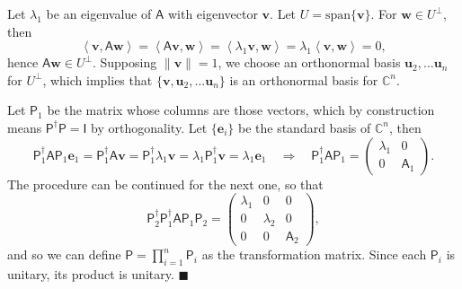 \documentclass[letter-paper]{tufte-book}
\newenvironment{proof}[1][Proof]{\begin{trivlist}
\item[\hskip \labelsep {\bfseries #1}]}{\end{trivlist}}
\newcommand{\inner}[2]{\left\langle #1, #2\right\rangle}
\newcommand{\As}{{\mathsf{A}}}
\newcommand{\Is}{{\mathsf{I}}}
\newcommand{\Ps}{{\mathsf{P}}}
\newcommand{\eb}{{\boldsymbol{e}}}
\newcommand{\ub}{{\boldsymbol{u}}}
\newcommand{\vb}{{\boldsymbol{v}}}
\newcommand{\wb}{{\boldsymbol{w}}}
\newcommand{\qed}{\hfill$\blacksquare$}
\begin{document}
\begin{proof}
  Let $\lambda_1$ be an eigenvalue of $\As$ with eigenvector $\vb$. Let $U = \mbox{span}\{\vb\}$. For $\wb \in U^\perp$, then
  \begin{equation*}
    \inner{\vb}{\As \wb} = \inner{\As \vb}{\wb} = \inner{\lambda_1\vb}{\wb} = \lambda_1\inner{\vb}{\wb} = 0,
  \end{equation*}
  hence $\As \wb \in U^\perp$. Supposing $\|\vb\|=1$, we choose an orthonormal basis $\ub_2, \ldots \ub_n$ for $U^\perp$, which implies that $\{\vb, \ub_2, \ldots \ub_n\}$ is an orthonormal basis for $\mathbb{C}^n$. 
  
  Let $\Ps_1$ be the matrix whose columns are those vectors, which by construction means $\Ps^\dagger \Ps = \Is$ by orthogonality. Let $\{\eb_i\}$ be the standard basis of $\mathbb{C}^n$, then
  \begin{equation*}
    \Ps_1^\dagger \As \Ps_1 \eb_1 = \Ps_1^\dagger \As \vb = \Ps_1^\dagger \lambda_1 \vb = \lambda_1 \Ps_1^\dagger \vb = \lambda_1 \eb_1 \quad \Rightarrow \quad \Ps_1^\dagger \As \Ps_1 = \begin{pmatrix}\lambda_1 & 0 \\ 0 & \As_1\end{pmatrix}.
  \end{equation*}
  The procedure can be continued for the next one, so that
  \begin{equation*}
    \Ps_2^\dagger \Ps_1^\dagger \As \Ps_1 \Ps_2 = \begin{pmatrix}\lambda_1 & 0 & 0 \\ 0 & \lambda_2 & 0 \\ 0 & 0 & \As_2\end{pmatrix},
  \end{equation*}
  and so we can define $\mathsf{P} = \prod_{i=1}^n \Ps_i$ as the transformation matrix. Since each $\Ps_i$ is unitary, its product is unitary. \qed
\end{proof}
\end{document}
